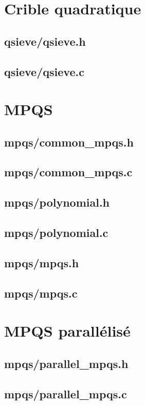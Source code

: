 \documentclass{article}
\newcommand{\importcode}[1]{
    \subsection{#1}
    
    \pagebreak
}
\begin{document}
\section{Crible quadratique}
\importcode{qsieve/qsieve.h}
\importcode{qsieve/qsieve.c}

\section{MPQS}
\importcode{mpqs/common\_mpqs.h}
\importcode{mpqs/common\_mpqs.c}
\importcode{mpqs/polynomial.h}
\importcode{mpqs/polynomial.c}
\importcode{mpqs/mpqs.h}
\importcode{mpqs/mpqs.c}

\section{MPQS parallélisé}
\importcode{mpqs/parallel\_mpqs.h}
\importcode{mpqs/parallel\_mpqs.c}
\end{document}
